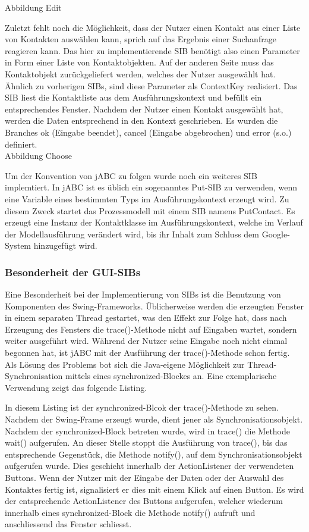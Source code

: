 Abbildung Edit

Zuletzt fehlt noch die Möglichkeit, dass der Nutzer einen Kontakt aus einer Liste von Kontakten auswählen kann, sprich auf das Ergebnis einer Suchanfrage reagieren kann. Das hier zu implementierende SIB benötigt also einen Parameter in Form einer Liste von Kontaktobjekten. Auf der anderen Seite muss das Kontaktobjekt zurückgeliefert werden, welches der Nutzer ausgewählt hat. Ähnlich zu vorherigen SIBs, sind diese Parameter als ContextKey realisiert. Das SIB liest die Kontaktliste aus dem Ausführungskontext und befüllt ein entsprechendes Fenster. Nachdem der Nutzer einen Kontakt ausgewählt hat, werden die Daten entsprechend in den Kontext geschrieben. Es wurden die Branches ok (Eingabe beendet), cancel (Eingabe abgebrochen) und error (s.o.) definiert.\\

Abbildung Choose

Um der Konvention von jABC zu folgen wurde noch ein weiteres SIB implemtiert. In jABC ist es üblich ein sogenanntes Put-SIB zu verwenden, wenn eine Variable eines bestimmten Typs im Ausführungskontext erzeugt wird. Zu diesem Zweck startet das Prozessmodell mit einem SIB namens PutContact. Es erzeugt eine Instanz der Kontaktklasse im Ausführungskontext, welche im Verlauf der Modellausführung verändert wird, bis ihr Inhalt zum Schluss dem Google-System hinzugefügt wird.
	

\subsubsection{Besonderheit der GUI-SIBs}
Eine Besonderheit bei der Implementierung von SIBs ist die Benutzung von Komponenten des Swing-Frameworks. Üblicherweise werden die erzeugten Fenster in einem separaten Thread gestartet, was den Effekt zur Folge hat, dass nach Erzeugung des Fensters die trace()-Methode nicht auf Eingaben wartet, sondern weiter ausgeführt wird. Während der Nutzer seine Eingabe noch nicht einmal begonnen hat, ist jABC mit der Ausführung der trace()-Methode schon fertig.\\

Als Lösung des Problems bot sich die Java-eigene Möglichkeit zur Thread-Synchronisation mittels eines synchronized-Blockes an. Eine exemplarische Verwendung zeigt das folgende Listing.


In diesem Listing ist der synchronized-Blcok der trace()-Methode zu sehen. Nachdem der Swing-Frame erzeugt wurde, dient jener als Synchronisationsobjekt. Nachdem der synchronized-Block betreten wurde, wird in trace() die Methode wait() aufgerufen. An dieser Stelle stoppt die Ausführung von trace(), bis das entsprechende Gegenstück, die Methode notify(), auf dem Synchronisationsobjekt aufgerufen wurde. Dies geschieht innerhalb der ActionListener der verwendeten Buttons. Wenn der Nutzer mit der Eingabe der Daten oder der Auswahl des Kontaktes fertig ist, signalisiert er dies mit einem Klick auf einen Button. Es wird der entsprechende ActionListener des Buttons aufgerufen, welcher wiederum innerhalb eines synchronized-Block die Methode notify() aufruft und anschliessend das Fenster schliesst.\\

